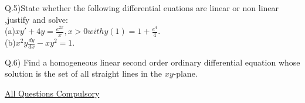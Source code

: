\documentclass[a4paper,12pt,oneside,article]{memoir}
\begin{document}
\begin{flushleft}
 Q.5)State whether the following differential euations are linear or non linear ,justify and solve:\\[10pt]
(a)$xy'+4y = \frac{e^{2x}}{x}, x>0 with y(1)=1+\frac{e^4}{4}. $\\

(b)$x^2y\frac{dy}{dx}- xy^2 = 1. $
\end{flushleft}

\begin{flushleft}
 Q.6) Find a homogeneous linear second order ordinary differential equation whose solution is the set of all straight lines in the $xy$-plane.\\ 
\end{flushleft}

\begin{center}
	\url{All Questions Compulsory}
\end{center}
\end{document}
